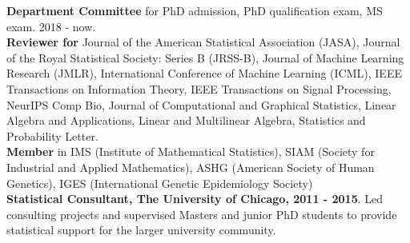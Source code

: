 \documentclass[letterpaper]{article}
\begin{document}
{\bf Department Committee} for PhD admission, PhD qualification exam, MS exam. 2018 - now. \\


{\bf Reviewer for} Journal of the American Statistical Association (JASA), Journal of the Royal Statistical Society: Series B (JRSS-B), Journal of Machine Learning Research (JMLR), International Conference of Machine Learning (ICML), IEEE Transactions on Information Theory, IEEE Transactions on Signal Processing, NeurIPS Comp Bio, Journal of Computational and Graphical Statistics, Linear Algebra and Applications, Linear and Multilinear Algebra, Statistics and Probability Letter. \\ %



{\bf Member} in IMS (Institute of Mathematical Statistics), SIAM (Society for Industrial and Applied Mathematics), ASHG (American Society of Human Genetics), IGES (International Genetic Epidemiology Society)\\

{\bf Statistical Consultant, The University of Chicago, 2011 - 2015}. Led consulting projects and supervised Masters and junior PhD students to provide statistical support for the larger university community.  








\end{document}
